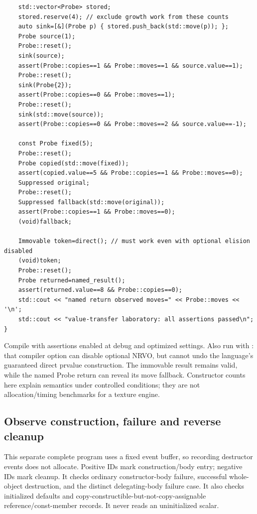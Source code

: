 \begin{verbatim}
    std::vector<Probe> stored;
    stored.reserve(4); // exclude growth work from these counts
    auto sink=[&](Probe p) { stored.push_back(std::move(p)); };
    Probe source(1);
    Probe::reset();
    sink(source);
    assert(Probe::copies==1 && Probe::moves==1 && source.value==1);
    Probe::reset();
    sink(Probe{2});
    assert(Probe::copies==0 && Probe::moves==1);
    Probe::reset();
    sink(std::move(source));
    assert(Probe::copies==0 && Probe::moves==2 && source.value==-1);

    const Probe fixed(5);
    Probe::reset();
    Probe copied(std::move(fixed));
    assert(copied.value==5 && Probe::copies==1 && Probe::moves==0);
    Suppressed original;
    Probe::reset();
    Suppressed fallback(std::move(original));
    assert(Probe::copies==1 && Probe::moves==0);
    (void)fallback;

    Immovable token=direct(); // must work even with optional elision disabled
    (void)token;
    Probe::reset();
    Probe returned=named_result();
    assert(returned.value==8 && Probe::copies==0);
    std::cout << "named return observed moves=" << Probe::moves << '\n';
    std::cout << "value-transfer laboratory: all assertions passed\n";
}
\end{verbatim}

Compile with assertions enabled at debug and optimized settings. Also run with : that compiler option can disable optional NRVO, but cannot undo the language's guaranteed direct prvalue construction. The immovable result remains valid, while the named Probe return can reveal its move fallback. Constructor counts here explain semantics under controlled conditions; they are not allocation/timing benchmarks for a texture engine.

\subsection{Observe construction, failure and reverse cleanup}\label{05-engine-i-ch004-observe-construction-failure-and-reverse-cleanup}

\hypertarget{05-engine-i-ch004-observe-construction-failure-and-reverse-cleanup}{}

This separate complete program uses a fixed event buffer, so recording destructor events does not allocate. Positive IDs mark construction/body entry; negative IDs mark cleanup. It checks ordinary constructor-body failure, successful whole-object destruction, and the distinct delegating-body failure case. It also checks initialized defaults and copy-constructible-but-not-copy-assignable reference/const-member records. It never reads an uninitialized scalar.


